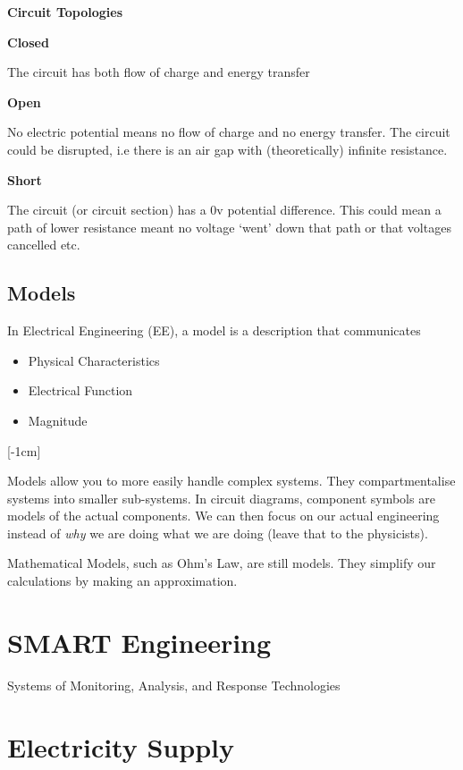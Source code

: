 \documentclass[12pt]{article}
\begin{document}
\begin{theorem*}
{\bf Circuit Topologies}
\begin{center}
\textbf{Closed}
\end{center}
The circuit has both flow of charge and energy transfer

\begin{center}
\textbf{Open}
\end{center}

No electric potential means no flow of charge and no energy transfer. 
The circuit could be disrupted, i.e there is an air gap with (theoretically) infinite resistance.

\begin{center}
\textbf{Short}
\end{center}

The circuit (or circuit section) has a 0v potential difference.
This could mean a path of lower resistance meant no voltage `went' down that path or that voltages cancelled etc.
\end{theorem*}

\subsection{Models}
In Electrical Engineering (EE), a model is a description that communicates

\begin{itemize}
  \item Physical Characteristics 
  \item Electrical Function
  \item Magnitude
\end{itemize}

[-1cm]

\vspace{3pt}
Models allow you to more easily handle complex systems.
They compartmentalise systems into smaller sub-systems.
In circuit diagrams, component symbols are models of the actual components.
We can then focus on our actual engineering instead of {\it why} we are doing what we are doing (leave that to the physicists).

Mathematical Models, such as Ohm's Law, are still models. 
They simplify our calculations by making an approximation.

\section{SMART Engineering}
\begin{definition*}
  Systems of Monitoring, Analysis, and Response Technologies
\end{definition*}

\section{Electricity Supply}
\end{document}
